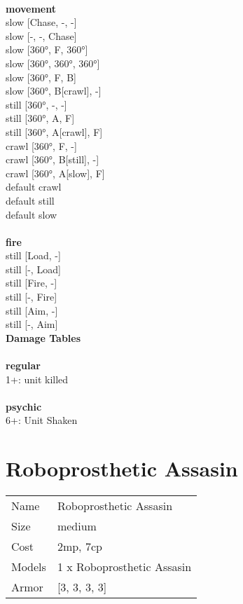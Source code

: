 \ \\ {\bf movement } \\
slow [Chase, -, -] \\
slow [-, -, Chase] \\
slow [360°, F, 360°] \\
slow [360°, 360°, 360°] \\
slow [360°, F, B] \\
slow [360°, B[crawl], -] \\
still [360°, -, -] \\
still [360°, A, F] \\
still [360°, A[crawl], F] \\
crawl [360°, F, -] \\
crawl [360°, B[still], -] \\
crawl [360°, A[slow], F] \\
default crawl \\
default still \\
default slow \\
\ \\ {\bf fire } \\
still [Load, -] \\
still [-, Load] \\
still [Fire, -] \\
still [-, Fire] \\
still [Aim, -] \\
still [-, Aim] \\


{\bf Damage Tables} \\
\ \\ {\bf regular } \\
1+: unit killed \\
\ \\ {\bf psychic } \\
6+: Unit Shaken \\










\pagebreak\pagebreak

\section{ Roboprosthetic Assasin }

\begin{tabular}{ll}
  Name & Roboprosthetic Assasin \\
  Size & medium\\
  Cost & 2mp, 7cp\\
  Models & 1 x Roboprosthetic Assasin\\
  Armor & [3, 3, 3, 3]\\
\end{tabular}


